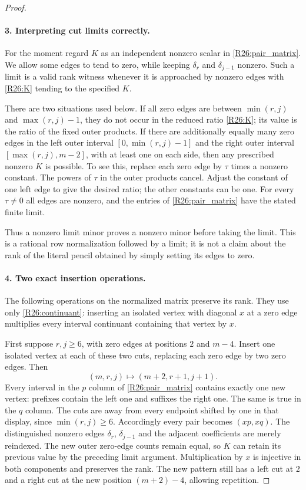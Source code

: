 \begin{proof}
\paragraph{3. Interpreting cut limits correctly.}
For the moment regard $K$ as an independent nonzero scalar in
\eqref{R26:pair_matrix}. We allow some edges to tend to zero,
while keeping $\delta_r$ and $\delta_{j-1}$ nonzero. Such a limit
is a valid rank witness whenever it is approached by nonzero edges
with \eqref{R26:K} tending to the specified $K$.

There are two situations used below. If all zero edges are between
$\min(r,j)$ and $\max(r,j)-1$, they do not occur in the reduced
ratio \eqref{R26:K}; its value is the ratio of the fixed outer
products. If there are additionally equally many zero edges in
the left outer interval $[0,\min(r,j)-1]$ and the right outer
interval $[\max(r,j),m-2]$, with at least one on each side, then
any prescribed nonzero $K$ is possible. To see this, replace each
zero edge by $\tau$ times a nonzero constant. The powers of
$\tau$ in the outer products cancel. Adjust the constant of one
left edge to give the desired ratio; the other constants can be
one. For every $\tau\ne0$ all edges are nonzero, and the entries
of \eqref{R26:pair_matrix} have the stated finite limit.

Thus a nonzero limit minor proves a nonzero minor before taking
the limit. This is a rational row normalization followed by a
limit; it is not a claim about the rank of the literal pencil
obtained by simply setting its edges to zero.

\paragraph{4. Two exact insertion operations.}
The following operations on the normalized matrix preserve its
rank. They use only \eqref{R26:continuant}: inserting an isolated
vertex with diagonal $x$ at a zero edge multiplies every interval
continuant containing that vertex by $x$.

First suppose $r,j\geq6$, with zero edges at positions $2$ and
$m-4$. Insert one isolated vertex at each of these two cuts,
replacing each zero edge by two zero edges. Then
\[
 (m,r,j)\longmapsto(m+2,r+1,j+1).
\]
Every interval in the $p$ column of \eqref{R26:pair_matrix}
contains exactly one new vertex: prefixes contain the left one
and suffixes the right one. The same is true in the $q$ column.
The cuts are away from every endpoint shifted by one in that
display, since $\min(r,j)\geq6$. Accordingly every pair becomes
$(xp,xq)$. The distinguished nonzero edges $\delta_r$,
$\delta_{j-1}$ and the adjacent coefficients are merely
reindexed. The new outer zero-edge counts remain equal, so $K$
can retain its previous value by the preceding limit argument.
Multiplication by $x$ is injective in both components and
preserves the rank. The new pattern still has a left cut at $2$
and a right cut at the new position $(m+2)-4$, allowing repetition.


\end{proof}
